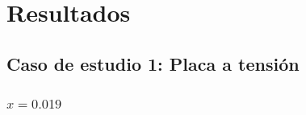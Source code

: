 \section{Resultados}
\label{sc:resultados}

\subsection{Caso de estudio 1: Placa a tensión}
	\subsubsection{\texorpdfstring{$x=0.019$}{x=0.019}}

